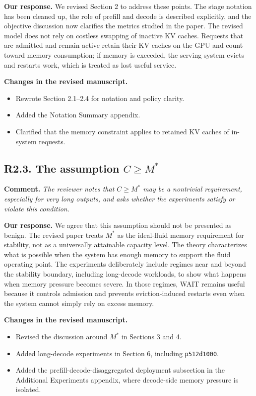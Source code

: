 \documentclass[11pt]{article}
\newcommand{\comment}[1]{%
  \vspace{0.25em}
  \noindent\textbf{Comment.} \emph{#1}
}
\newcommand{\response}{\vspace{0.25em}\noindent\textbf{Our response.} }
\newcommand{\changes}{\vspace{0.25em}\noindent\textbf{Changes in the revised manuscript.} }
\begin{document}
\response We revised Section 2 to address these points. The stage notation has been cleaned up, the role of prefill and decode is described explicitly, and the objective discussion now clarifies the metrics studied in the paper. The revised model does not rely on costless swapping of inactive KV caches. Requests that are admitted and remain active retain their KV caches on the GPU and count toward memory consumption; if memory is exceeded, the serving system evicts and restarts work, which is treated as lost useful service.

\changes
\begin{itemize}
    \item Rewrote Section 2.1--2.4 for notation and policy clarity.
    \item Added the Notation Summary appendix.
    \item Clarified that the memory constraint applies to retained KV caches of in-system requests.
\end{itemize}

\subsection*{R2.3. The assumption \(C \ge M^*\)}

\comment{The reviewer notes that \(C \ge M^*\) may be a nontrivial requirement, especially for very long outputs, and asks whether the experiments satisfy or violate this condition.}

\response We agree that this assumption should not be presented as benign. The revised paper treats \(M^*\) as the ideal-fluid memory requirement for stability, not as a universally attainable capacity level. The theory characterizes what is possible when the system has enough memory to support the fluid operating point. The experiments deliberately include regimes near and beyond the stability boundary, including long-decode workloads, to show what happens when memory pressure becomes severe. In those regimes, WAIT remains useful because it controls admission and prevents eviction-induced restarts even when the system cannot simply rely on excess memory.

\changes
\begin{itemize}
    \item Revised the discussion around \(M^*\) in Sections 3 and 4.
    \item Added long-decode experiments in Section 6, including \texttt{p512d1000}.
    \item Added the prefill-decode-disaggregated deployment subsection in the Additional Experiments appendix, where decode-side memory pressure is isolated.
\end{itemize}
\end{document}
